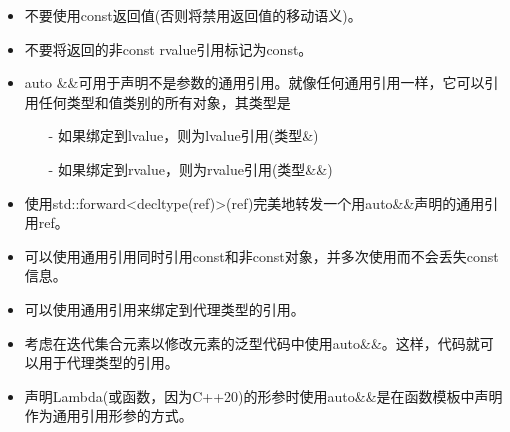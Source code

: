 \begin{itemize}
	\item 不要使用const返回值(否则将禁用返回值的移动语义)。
	\item 不要将返回的非const rvalue引用标记为const。
	\item auto \&\&可用于声明不是参数的通用引用。就像任何通用引用一样，它可以引用任何类型和值类别的所有对象，其类型是
	\begin{itemize}
		\item[-] 如果绑定到lvalue，则为lvalue引用(类型\&)
		\item[-] 如果绑定到rvalue，则为rvalue引用(类型\&\&)
	\end{itemize}
	\item 使用std::forward<decltype(ref)>(ref)完美地转发一个用auto\&\&声明的通用引用ref。
	\item 可以使用通用引用同时引用const和非const对象，并多次使用而不会丢失const信息。
	\item 可以使用通用引用来绑定到代理类型的引用。
	\item 考虑在迭代集合元素以修改元素的泛型代码中使用auto\&\&。这样，代码就可以用于代理类型的引用。
	\item 声明Lambda(或函数，因为C++20)的形参时使用auto\&\&是在函数模板中声明作为通用引用形参的方式。
\end{itemize}


\newpage